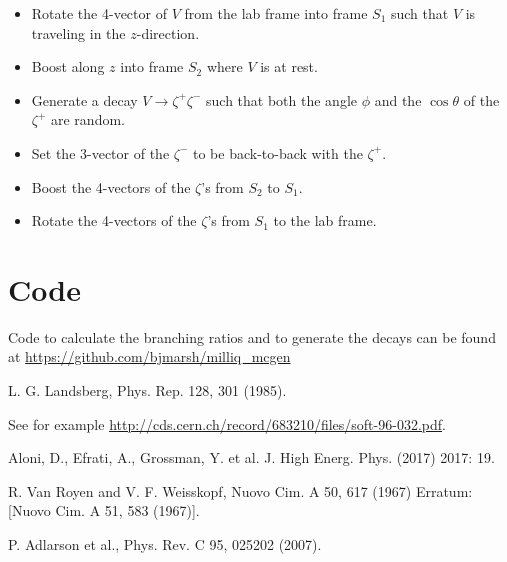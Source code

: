 \documentclass[12pt]{article}
\begin{document}
\begin{itemize}
  \item Rotate the 4-vector of $V$ from the lab frame into frame
    $S_1$ such that $V$ is traveling in the $z$-direction.
  \item  Boost along $z$ into frame $S_2$ where $V$ is at rest.
  \item Generate a decay $V \to \zeta^+ \zeta^-$ such that
    both the angle $\phi$ and the $\cos \theta$ of the $\zeta^+$ are random.
  \item   Set the 3-vector of the $\zeta^-$ to be back-to-back with the $\zeta^+$.
  \item Boost the 4-vectors of the $\zeta$'s from $S_2$ to $S_1$.
\item Rotate the 4-vectors of the $\zeta$'s from $S_1$ to the lab frame.
\end{itemize}


\section{Code}
Code to calculate the branching ratios and to generate the decays
can be found at
\href{https://github.com/bjmarsh/milliq\_mcgen}
{https://github.com/bjmarsh/milliq\_mcgen}


\begin{thebibliography}{1}

  L. G. Landsberg, Phys. Rep. 128, 301 (1985). 

  See for example \href{http://cds.cern.ch/record/683210/files/soft-96-032.pdf}
{http://cds.cern.ch/record/683210/files/soft-96-032.pdf}.

Aloni, D., Efrati, A., Grossman, Y. et al. J. High Energ. Phys. (2017) 2017: 19. 

  R. Van Royen and V. F. Weisskopf, Nuovo Cim. A 50, 617 (1967) Erratum: [Nuovo Cim. A 51, 583 (1967)].

 P. Adlarson et al., Phys. Rev. C 95, 025202 (2007).
  
\end{thebibliography}
  
\end{document}
